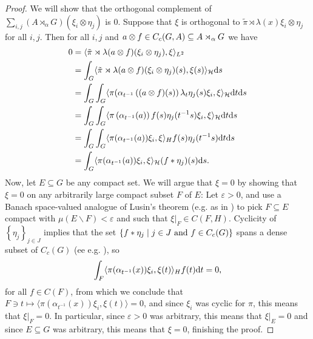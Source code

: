 \begin{proof}
We will show that the orthogonal complement of $\sum_{i,j} (A \rtimes_\alpha G)(\xi_i \otimes \eta_j)$ is $0$. Suppose that $\xi$ is orthogonal to $\tilde \pi \rtimes \lambda(x) \xi_i \otimes \eta_j$ for all $i,j$. Then for all $i,j$ and $a \otimes f \in C_c(G,A) \subseteq A \rtimes_\alpha G$ we have
\begin{align*}
	0 &= \langle \tilde \pi \rtimes \lambda (a \otimes f) (\xi_i \otimes \eta_j) , \xi \rangle_{L^2}\\
	&= \int_G \langle \tilde \pi \rtimes \lambda (a \otimes f) (\xi_i \otimes \eta_j)(s) , \xi(s)\rangle_{\mathcal{H}} \mathrm{d} s \\
	&= \int_G \int_G \langle \pi(\alpha_{t^{-1}}\left( (a \otimes f)(s) \right) \lambda_t \eta_j(s) \xi_i , \xi \rangle_{\mathcal{H}} \mathrm{d} t \mathrm{d} s\\
	&= \int_G \int_G \langle \pi\left( \alpha_{t^{-1}} (a) \right) f(s) \eta_j(t^{-1}s) \xi_i , \xi \rangle_{\mathcal{H}} \mathrm{d} t\mathrm{d} s\\
	&= \int_G \int_G \langle \pi( \alpha_{t^{-1}}(a) ) \xi_i , \xi \rangle_H f(s) \eta_j(t^{-1}s) \mathrm{d} t \mathrm{d} s \\
	&= \int_G \langle \pi(\alpha_{t^{-1}}(a)) \xi_i , \xi \rangle_{\mathcal{H}} (f \ast \eta_j)(s) \mathrm{d} s.
\end{align*}
Now, let $E \subseteq G$ be any compact set. We will argue that $\xi = 0$ by showing that $\xi = 0$ on any arbitrarily large compact subset $F$ of $E$: Let $\varepsilon > 0$, and use a Banach space-valued analogue of Lusin's theorem (e.g. as in \cite[Appendix B]{williamscrossed}) to pick $F \subseteq E$ compact with $\mu(E\backslash F) < \varepsilon$ and such that $\xi|_F \in C(F,H)$. Cyclicity of $\left\{ \eta_j \right\}_{j \in J}$ implies that the set $\{f \ast \eta_j \mid j \in J \text{ and } f \in C_c(G)\}$ spans a dense subset of $C_c(G)$ (ee e.g. \cite[Proposition 3.33]{folland2016fourier}), so
\begin{align*}
	\int_{F} \langle \pi(\alpha_{t^{-1}}(x)) \xi_i , \xi(t) \rangle_H f(t) \mathrm{d} t = 0,
\end{align*}
for all $f \in C(F)$, from which we conclude that $F \ni t \mapsto \langle \pi(\alpha_{t^{-1}}(x)) \xi_i , \xi(t) \rangle=0$, and since $\xi_i$ was cyclic for $\pi$, this means that $\xi|_F = 0$. In particular, since $\varepsilon > 0$ was arbitrary, this means that $\xi|_E = 0$ and since $E \subseteq G$ was arbitrary, this means that $\xi = 0$, finishing the proof.
\end{proof}

